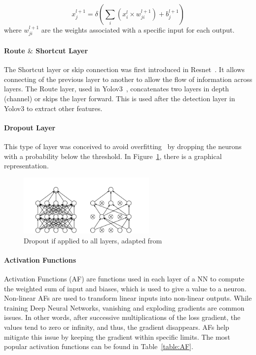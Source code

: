 \begin{equation} \label{equation:connected}
     \displaystyle x_{j}^{l+1}=\delta (\sum_{i}(x_{i}^{l} \times w_{ji}^{l+1})+ b_{j}^{l+1})
\end{equation}
where $w_{ji}^{l+1}$ are the weights associated with a specific input for each output.


\paragraph{Route $\&$ Shortcut Layer}

The Shortcut layer or skip connection was first introduced in
Resnet~\cite{resnet}.  It allows connecting of the previous layer to another to
allow the flow of information across layers.  The Route layer, used in
Yolov3~\cite{yolov3}, concatenates two layers in depth (channel) or skips the
layer forward. This is used after the detection layer in Yolov3 to extract other
features.

\paragraph{Dropout Layer}

This type of layer was conceived to avoid overfitting~\cite{Dropout} by dropping
the neurons with a probability below the threshold. In Figure~\ref{figure:Dropout}, there is a graphical representation.
\begin{figure}[!htbp]
    \centering
    \includegraphics[width=0.6\textwidth]{Figures/dropout.png}
    \caption{Dropout if applied to all layers, adapted from~\cite{Dropout}}
    \label{figure:Dropout}
\end{figure} 

\paragraph{Activation Functions}

Activation Functions (AF) are functions used in each layer of a NN
to compute the weighted sum of input and biases, which is used to give a value
to a neuron. Non-linear AFs are used to transform linear inputs into non-linear
outputs.  While training Deep Neural Networks, vanishing and exploding
gradients are common issues. In other words, after successive multiplications
of the loss gradient, the values tend to zero or infinity, and thus, the
gradient disappears. AFs help mitigate this issue by keeping the gradient within
specific limits. The most popular activation functions can be found in
Table~\ref{table:AF}.

